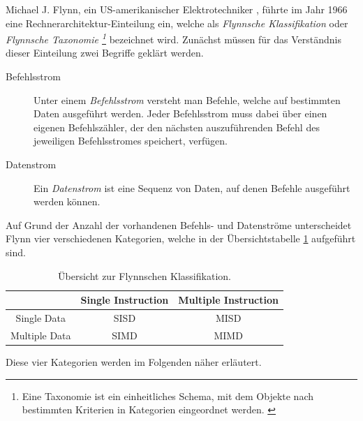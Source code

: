 				Michael J. Flynn, ein US-amerikanischer Elektrotechniker \cite{FlynnWikipedia}, führte im Jahr 1966 eine Rechnerarchitektur-Einteilung ein, welche als \textit{Flynnsche Klassifikation} oder \textit{Flynnsche Taxonomie \footnote{Eine Taxonomie ist ein einheitliches Schema, mit dem Objekte nach bestimmten Kriterien in Kategorien eingeordnet werden. \cite{TaxonomieWikipedia}}} bezeichnet wird. Zunächst müssen für das Verständnis dieser Einteilung zwei Begriffe geklärt werden.
				
				\begin{description}
					\item [Befehlsstrom]
						Unter einem \textit{Befehlsstrom} versteht man Befehle, welche auf bestimmten Daten ausgeführt werden. Jeder Befehlsstrom muss dabei über einen eigenen Befehlszähler, der den nächsten auszuführenden Befehl des jeweiligen Befehlsstromes speichert, verfügen. \cite{FlynnsTaxonomie}
					\item [Datenstrom]
						Ein \textit{Datenstrom} ist eine Sequenz von Daten, auf denen Befehle ausgeführt werden können. \cite{FlynnsTaxonomie}
				\end{description}
			
				Auf Grund der Anzahl der vorhandenen Befehls- und Datenströme unterscheidet Flynn vier verschiedenen Kategorien, welche in der Übersichtstabelle \ref{tab:UebersichtFlynnscheKlassifikation} aufgeführt sind.
				
				\begin{table}
					\caption{Übersicht zur Flynnschen Klassifikation.}
					\begin{tabular}{c|c|c}
						& Single Instruction & Multiple Instruction \\
						\hline
						Single Data & SISD & MISD \\
						Multiple Data & SIMD & MIMD \\
					\end{tabular}
					\label{tab:UebersichtFlynnscheKlassifikation}
				\end{table}
			
				Diese vier Kategorien werden im Folgenden näher erläutert.
			

